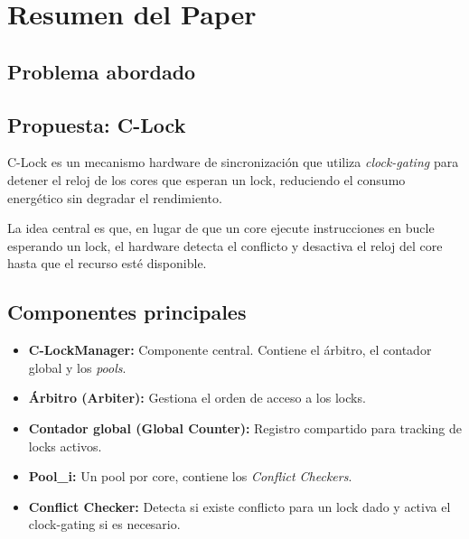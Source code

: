 
\section{Resumen del Paper}

\subsection{Problema abordado}


\subsection{Propuesta: C-Lock}

C-Lock es un mecanismo hardware de sincronización que utiliza \textit{clock-gating} para
detener el reloj de los cores que esperan un lock, reduciendo el consumo energético sin
degradar el rendimiento.

La idea central es que, en lugar de que un core ejecute instrucciones en bucle esperando
un lock, el hardware detecta el conflicto y desactiva el reloj del core hasta que el
recurso esté disponible.

\subsection{Componentes principales}

\begin{itemize}
    \item \textbf{C-LockManager:} Componente central. Contiene el árbitro, el contador
          global y los \textit{pools}.
    \item \textbf{Árbitro (Arbiter):} Gestiona el orden de acceso a los locks.
    \item \textbf{Contador global (Global Counter):} Registro compartido para tracking
          de locks activos.
    \item \textbf{Pool\_i:} Un pool por core, contiene los \textit{Conflict Checkers}.
    \item \textbf{Conflict Checker:} Detecta si existe conflicto para un lock dado y
          activa el clock-gating si es necesario.
\end{itemize}

